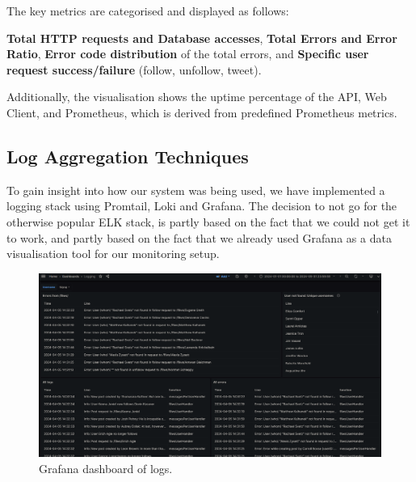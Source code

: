 The key metrics are categorised and displayed as follows:

\textbf{Total HTTP requests and Database accesses}, \textbf{Total Errors and Error Ratio}, \textbf{Error code distribution} of the total errors, and \textbf{Specific user request success/failure} (follow, unfollow, tweet). 

Additionally, the visualisation shows the uptime percentage of the API, Web Client, and Prometheus, which is derived from predefined Prometheus metrics.



\subsection{Log Aggregation Techniques}
To gain insight into how our system was being used, we have implemented a logging stack using Promtail, Loki and Grafana. 
The decision to not go for the otherwise popular ELK stack, is partly based on the fact that we could not get it to work, and partly based on the fact that we already used Grafana as a data visualisation tool for our monitoring setup.

\begin{figure}[h]
    \centering
    \includegraphics[width=\textwidth]{images/logging.png}
    \caption{Grafana dashboard of logs.}
    \label{fig:logging}
\end{figure}

